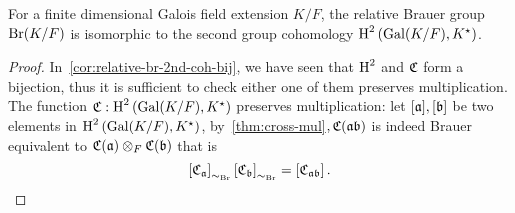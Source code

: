 \begin{corollary}
  For a finite dimensional Galois field extension $K/F$, the relative Brauer group $\operatorname{Br}(K/F)$ is isomorphic to the second group cohomology $\operatorname{H}^{2}\left(\operatorname{Gal}(K/F),K^{\star}\right)$.
  \leanok
\end{corollary}
\begin{proof}
  In~\cref{cor:relative-br-2nd-coh-bij}, we have seen that $\operatorname{H}^{2}$ and $\operatorname{\mathfrak{C}}$ form a bijection, thus it is sufficient to check either one of them preserves multiplication. The function $\operatorname{\mathfrak{C}}: \operatorname{H}^{2}\left(\operatorname{Gal}(K/F), K^{\star}\right)$ preserves multiplication: let $[\mathfrak{a}], [\mathfrak{b}]$ be two elements in $\operatorname{H}^{2}\left(\operatorname{Gal}(K/F), K^{\star}\right)$, by~\cref{thm:cross-mul}$, \operatorname{\mathfrak{C}}(\mathfrak{a}\mathfrak{b})$ is indeed Brauer equivalent to $\operatorname{\mathfrak{C}}(\mathfrak{a})\otimes_{F}\operatorname{\mathfrak{C}}(\mathfrak{b})$ that is
  \[
    \left[\operatorname{\mathfrak{C}}_{\mathfrak{a}}\right]_{\sim_{\operatorname{Br}}}\left[\operatorname{\mathfrak{C}}_{\mathfrak{b}}\right]_{\sim_{\operatorname{Br}}} = \left[\operatorname{\mathfrak{C}}_{\mathfrak{a}\mathfrak{b}}\right].
  \]
\end{proof}




